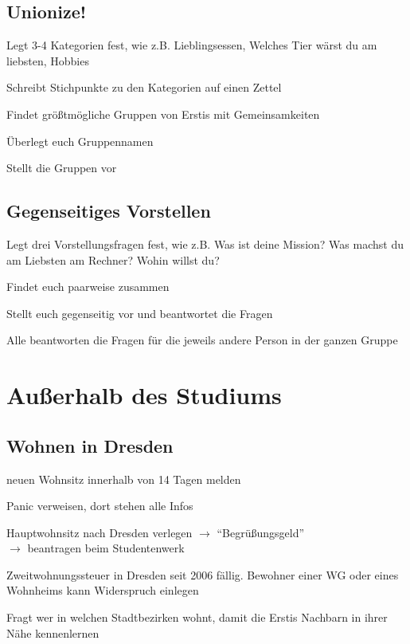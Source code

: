 \documentclass[a4paper,12pt]{report}
\begin{document}
\subsection{Unionize!}
\begin{itemize*}
	\item Legt 3-4 Kategorien fest, wie z.B. Lieblingsessen, Welches Tier wärst du am liebsten, Hobbies
	\item Schreibt Stichpunkte zu den Kategorien auf einen Zettel
	\item Findet größtmögliche Gruppen von Erstis mit Gemeinsamkeiten
	\item Überlegt euch Gruppennamen
	\item Stellt die Gruppen vor
\end{itemize*}

\subsection{Gegenseitiges Vorstellen}
\begin{itemize*}
	\item Legt drei Vorstellungsfragen fest, wie z.B. Was ist deine Mission? Was machst du am Liebsten am Rechner? Wohin willst du?
	\item Findet euch paarweise zusammen
	\item Stellt euch gegenseitig vor und beantwortet die Fragen
	\item Alle beantworten die Fragen für die jeweils andere Person in der ganzen Gruppe
\end{itemize*}

\section{Außerhalb des Studiums}

\subsection{Wohnen in Dresden}
\begin{itemize*}
	\item neuen Wohnsitz innerhalb von 14 Tagen melden
	\item Panic verweisen, dort stehen alle Infos
	\item Hauptwohnsitz nach Dresden verlegen $\rightarrow$  \enquote{Begrüßungsgeld}\\
	$\rightarrow$ beantragen beim Studentenwerk
	\item Zweitwohnungssteuer in Dresden seit 2006 fällig. Bewohner einer WG oder eines Wohnheims kann Widerspruch einlegen
	\item Fragt wer in welchen Stadtbezirken wohnt, damit die Erstis Nachbarn in ihrer Nähe kennenlernen
\end{itemize*}
\end{document}

